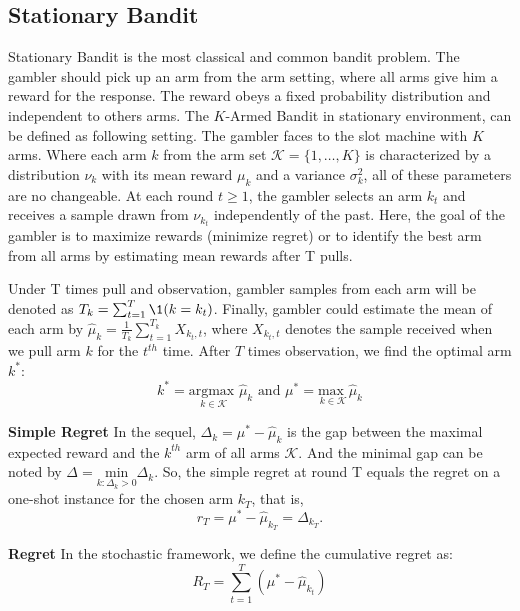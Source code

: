 \subsection{Stationary Bandit}
\label{subsec:stationary}

Stationary Bandit\cite{robbins1952bandit} is the most classical and common bandit problem. The gambler should pick up an arm from the arm setting, where all arms give him a reward for the response. The reward obeys a fixed probability distribution and independent to others arms. 
The $K$-Armed Bandit in stationary environment, can be defined as following setting. The gambler faces to the slot machine with $K$ arms. Where each arm $k$ from the arm set $\mathscr{K} = \{1,\dots, K\}$ is characterized by a distribution $\nu_k$ with its mean reward $\mu_k$ and a variance $\sigma^2_k$, all of these parameters are no changeable. At each round $t \geqslant 1$, the gambler selects an arm $k_t$ and receives a sample drawn from $\nu_{k_t}$ independently of the past. Here, the goal of the gambler is to maximize rewards (minimize regret) or to identify the best arm from all arms by estimating mean rewards after T pulls.

Under T times pull and observation, gambler samples from each arm will be denoted as $T_k = \sum_{t=1}^{T} \1(k = k_t)$. Finally, gambler could estimate the mean of each arm by $\hat{\mu}_{k} = \frac{1}{T_k}\sum_{t=1}^{T_k}X_{k_t,t}$, where $X_{k_t,t}$ denotes the sample received when we pull arm $k$ for the $t^{th}$ time. After $T$ times observation, we find the optimal arm $k^{\ast}$:
\begin{equation}
\label{equa:optarm}
k^{\ast} = \underset{k \in \mathscr{K}}{\text{argmax }} \hat{\mu}_k \text{  and \ \  }
\mu^{\ast} = \underset{k \in \mathscr{K}}{\text{max }} \hat{\mu}_k
\end{equation}

\textbf{Simple Regret}
In the sequel, $\Delta_k = \mu^{\ast}- \hat{\mu}_k$ is the gap between the maximal expected reward and the $k^{th}$ arm of all arms $\mathscr{K}$. And the minimal gap can be noted by $\Delta = \underset{k: \Delta_k>0}{\text{min}} \Delta_k$.
So, the simple regret at round T equals the regret on a one-shot instance for the chosen arm $k_T$, that is,
\begin{equation}
r_T = \mu^{\ast} - \hat{\mu}_{k_T} = \Delta_{k_T}.
\end{equation}

\textbf{Regret}
In the stochastic framework, we define the cumulative regret as:
\begin{equation}
R_T = \sum_{t=1}^{T} (\mu^{\ast}-\hat{\mu}_{k_t})
\end{equation}
